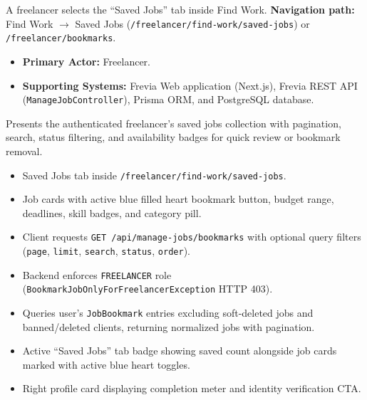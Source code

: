 A freelancer selects the ``Saved Jobs'' tab inside Find Work.\newline
\textbf{Navigation path:} Find Work $\rightarrow$ Saved Jobs (\texttt{/freelancer/find-work/saved-jobs}) or \texttt{/freelancer/bookmarks}.


\begin{itemize}[leftmargin=1.6em,topsep=3pt,itemsep=2pt,parsep=0pt,label=$\bullet$]
    \item \textbf{Primary Actor:} Freelancer.
    \item \textbf{Supporting Systems:} Frevia Web application (Next.js), Frevia REST API (\texttt{ManageJobController}), Prisma ORM, and PostgreSQL database.
\end{itemize}

\noindent Presents the authenticated freelancer's saved jobs collection with pagination, search, status filtering, and availability badges for quick review or bookmark removal.

\begin{itemize}[leftmargin=1.6em,topsep=3pt,itemsep=2pt,parsep=0pt,label=$\bullet$]
    \item Saved Jobs tab inside \texttt{/freelancer/find-work/saved-jobs}.
    \item Job cards with active blue filled heart bookmark button, budget range, deadlines, skill badges, and category pill.
\end{itemize}

\begin{itemize}[leftmargin=1.6em,topsep=3pt,itemsep=2pt,parsep=0pt,label=$\bullet$]
    \item Client requests \texttt{GET /api/manage-jobs/bookmarks} with optional query filters (\texttt{page}, \texttt{limit}, \texttt{search}, \texttt{status}, \texttt{order}).
    \item Backend enforces \texttt{FREELANCER} role (\texttt{BookmarkJobOnlyForFreelancerException} HTTP 403).
    \item Queries user's \texttt{JobBookmark} entries excluding soft-deleted jobs and banned/deleted clients, returning normalized jobs with pagination.
\end{itemize}

\begin{itemize}[leftmargin=1.6em,topsep=3pt,itemsep=2pt,parsep=0pt,label=$\bullet$]
    \item Active ``Saved Jobs'' tab badge showing saved count alongside job cards marked with active blue heart toggles.
    \item Right profile card displaying completion meter and identity verification CTA.
\end{itemize}

